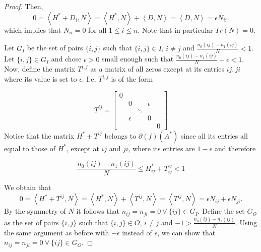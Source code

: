\documentclass[12pt]{amsart}
\theoremstyle{remark}
\begin{document}
\begin{proof}
Then,
\[
0 = \left \langle H^*+D_i,N \right\rangle = \left \langle H^*,N \right\rangle +  \left \langle D,N \right\rangle = \left \langle D,N \right\rangle = \epsilon N_{ii}.
\]
which implies that $N_{ii}=0$ for all $1\leq i\leq n$. Note that in particular $Tr(N)=0$. 

Let $G_I$ be the set of pairs $\{i,j\}$ such that $\{i,j\}\in I$, $i\neq j$ and $\frac{n_0(ij)-n_1(ij)}{N}< 1$.
Let $\{i,j\} \in G_I$ and chose $\epsilon>0$ small enough such that $\frac{n_0(ij)-n_1(ij)}{N}+\epsilon< 1.$
Now, define the matrix $T^{i,j}$ as a matrix of all zeros except at its entries $ij,ji$ where its value is set to $\epsilon$. I.e, $T^{i,j}$ is of the form

\[
T^{ij} = 
 \begin{bmatrix}
    0 & & & & \\
   & 0&  &\epsilon  & \\
   & &\ddots &  &\\
   &  \epsilon & & 0& \\
   &  &  &  & 0
  \end{bmatrix}
\]
Notice that the matrix $H^*+T^{ij}$ belongs to $\partial(f)(A^*)$ since all its entries all equal to those of $H^*$, except at $ij$ and $ji$, where its entries are $1-\epsilon$ and therefore

\[\frac{n_0(ij)-n_1(ij)}{N}\leq H_{ij}^*+T^{ij}_{ij} <1\]

We obtain that
\[
0 = \left \langle H^*+T^{ij},N \right \rangle = \left \langle H^*,N \right \rangle + \left \langle T^{ij},N \right \rangle = \left \langle T^{ij},N \right \rangle = \epsilon N_{ij} + \epsilon N_{ji}. 
\]
By the symmetry of $N$ it follows that $n_{ij}=n_{ji}=0 \ \forall  \ \{ij\} \in G_I$.
Define the set $G_O$ as the set of pairs $\{i,j\}$ such that $\{i,j\}\in O$, $i\neq j$ and $-1> \frac{n_0(ij)-n_1(ij)}{N}$.
Using the same argument as before with $-\epsilon$ instead of $\epsilon$, we can show that 
$n_{ij}=n_{ji}=0 \ \forall  \ \{ij\} \in G_O$.


\end{proof}
\end{document}
